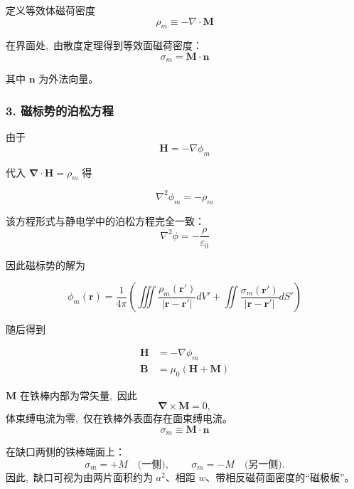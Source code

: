 定义等效体磁荷密度
\begin{equation}
\rho_m \equiv -\nabla\cdot \boldsymbol M
\end{equation}

在界面处, \,由散度定理得到等效面磁荷密度：
\begin{equation}
\sigma_m = \boldsymbol M\cdot \boldsymbol n
\end{equation}

其中 $\boldsymbol n$ 为外法向量。


\subsubsection*{3. 磁标势的泊松方程}

由于
\[
\boldsymbol H = -\nabla\phi_m
\]

代入 $\boldsymbol\nabla\cdot\boldsymbol H = \rho_m$ 得

\begin{equation}
\nabla^2 \phi_m = -\rho_m
\end{equation}

该方程形式与静电学中的泊松方程完全一致：
\[
\nabla^2 \phi = -\frac{\rho}{\varepsilon_0}
\]

因此磁标势的解为

\begin{equation}
\phi_m(\boldsymbol r)
=
\frac{1}{4\pi}
\left(
\iiint
\frac{\rho_m(\boldsymbol r')}{|\boldsymbol r-\boldsymbol r'|} dV'
+
\iint
\frac{\sigma_m(\boldsymbol r')}{|\boldsymbol r-\boldsymbol r'|} dS'
\right)
\end{equation}

随后得到

\begin{align}
\boldsymbol H &= -\nabla \phi_m \\
\boldsymbol B &= \mu_0(\boldsymbol H + \boldsymbol M)
\end{align}

 $\boldsymbol M$ 在铁棒内部为常矢量, \,因此
\[
\boldsymbol\nabla\times\boldsymbol M = 0,
\]
体束缚电流为零, \,仅在铁棒外表面存在面束缚电流。
\[
\sigma_m \equiv \boldsymbol M\cdot\boldsymbol n
\]


在缺口两侧的铁棒端面上：
\[
\sigma_m = +M \quad \text{(一侧)}, \,\qquad
\sigma_m = -M \quad \text{(另一侧)}.
\]
因此, \,缺口可视为由两片面积约为 $a^2$、相距 $w$、带相反磁荷面密度的“磁极板”。



